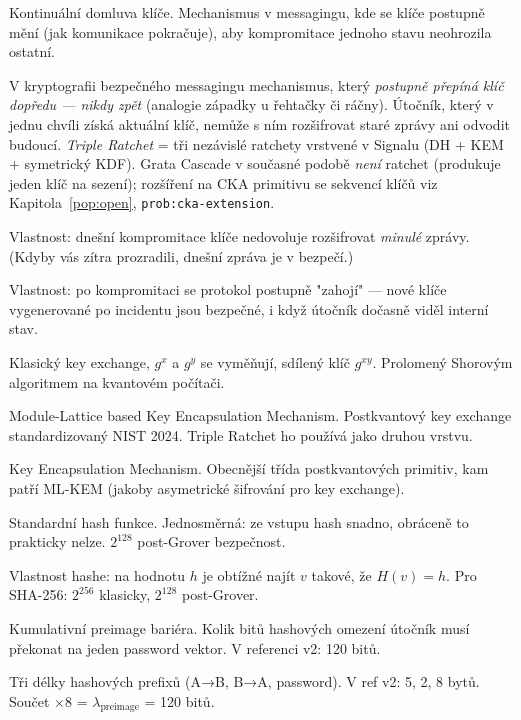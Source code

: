 \documentclass[11pt,a4paper]{article}
\begin{document}
\begin{description}[leftmargin=*, style=nextline]
\item[CKA (Continuous Key Agreement)] Kontinuální domluva klíče. Mechanismus v messagingu, kde se klíče postupně mění (jak komunikace pokračuje), aby kompromitace jednoho stavu neohrozila ostatní.
\item[Ratchet] V kryptografii bezpečného messagingu mechanismus, který \emph{postupně přepíná klíč dopředu --- nikdy zpět} (analogie západky u řehtačky či ráčny). Útočník, který v jednu chvíli získá aktuální klíč, nemůže s ním rozšifrovat staré zprávy ani odvodit budoucí. \emph{Triple Ratchet} = tři nezávislé ratchety vrstvené v Signalu (DH + KEM + symetrický KDF). Grata Cascade v současné podobě \emph{není} ratchet (produkuje jeden klíč na sezení); rozšíření na CKA primitivu se sekvencí klíčů viz Kapitola~\ref{pop:open}, \texttt{prob:cka-extension}.
\item[Forward Secrecy (FS)] Vlastnost: dnešní kompromitace klíče nedovoluje rozšifrovat \emph{minulé} zprávy. (Kdyby vás zítra prozradili, dnešní zpráva je v bezpečí.)
\item[Post-Compromise Security (PCS)] Vlastnost: po kompromitaci se protokol postupně "zahojí" --- nové klíče vygenerované po incidentu jsou bezpečné, i když útočník dočasně viděl interní stav.
\item[Diffieho-Hellman (DH, ECDH)] Klasický key exchange, $g^x$ a $g^y$ se vyměňují, sdílený klíč $g^{xy}$. Prolomený Shorovým algoritmem na kvantovém počítači.
\item[ML-KEM] Module-Lattice based Key Encapsulation Mechanism. Postkvantový key exchange standardizovaný NIST 2024. Triple Ratchet ho používá jako druhou vrstvu.
\item[KEM] Key Encapsulation Mechanism. Obecnější třída postkvantových primitiv, kam patří ML-KEM (jakoby asymetrické šifrování pro key exchange).
\item[SHA-256] Standardní hash funkce. Jednosměrná: ze vstupu hash snadno, obráceně to prakticky nelze. $2^{128}$ post-Grover bezpečnost.
\item[Preimage resistance] Vlastnost hashe: na hodnotu $h$ je obtížné najít $v$ takové, že $H(v) = h$. Pro SHA-256: $2^{256}$ klasicky, $2^{128}$ post-Grover.
\item[$\lambda_\text{preimage}$] Kumulativní preimage bariéra. Kolik bitů hashových omezení útočník musí překonat na jeden password vektor. V referenci v2: 120 bitů.
\item[$h_{AB}, h_{BA}, h_P$] Tři délky hashových prefixů (A→B, B→A, password). V ref v2: 5, 2, 8 bytů. Součet $\times 8$ = $\lambda_\text{preimage}$ = 120 bitů.

\end{description}
\end{document}
